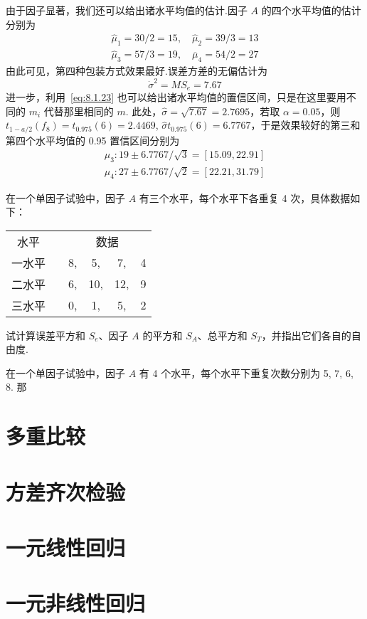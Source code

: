 \begin{example}
  由于因子显著，我们还可以给出诸水平均值的估计.因子 $A$ 的四个水平均值的估计分别为 
  \begin{gather*}
    \hat{\mu}_{1}=30 / 2=15, \quad \hat{\mu}_{2}=39 / 3=13 \\
    \hat{\mu}_{3}=57 / 3=19, \quad \overline{\mu}_{4}=54 / 2=27
  \end{gather*} 
  由此可见，第四种包装方式效果最好.误差方差的无偏估计为
  \begin{equation*}
    \dot{\sigma}^{2}=M S_{e}=7.67
  \end{equation*}
  进一步，利用~\eqref{eq:8.1.23} 也可以给出诸水平均值的置信区间，只是在这里要用不同的 $m_i$ 代替那里相同的 $m$. 此处，$\hat{\sigma} = \sqrt{7.67}=2.7695$，若取 $\alpha=0.05$，则 $t_{1-a / 2}\left(f_{8}\right)=t_{0.975}(6)=2.4469$, $\hat{\sigma} t_{0.975}(6)=6.7767$，于是效果较好的第三和第四个水平均值的 0.95 置信区间分别为
\begin{gather*}
  \mu_{3} : 19 \pm 6.7767 / \sqrt{3}=[15.09,22.91] \\
  \mu_{4} : 27 \pm 6.7767 / \sqrt{2}=[22.21,31.79]
\end{gather*}
\end{example}

\begin{xiti}
  \item 在一个单因子试验中，因子 $A$ 有三个水平，每个水平下各重复 4 次，具体数据如下：
    \begin{tabular}{cccccc}
    水平    &       & \multicolumn{4}{c}{数据} \\
    一水平   &       & 8,    & 5,    & 7,    & 4 \\
    二水平   &       & 6,    & 10,   & 12,   & 9 \\
    三水平   &       & 0,    & 1,    & 5,    & 2 \\
    \end{tabular}%
    试计算误差平方和 $S_e$、因子 $A$ 的平方和 $S_A$、总平方和 $S_T$，并指出它们各自的自由度.
    \item 在一个单因子试验中，因子 $A$ 有 4 个水平，每个水平下重复次数分别为 5, 7, 6, 8. 那
\end{xiti}

\section{多重比较}\label{sec:8.2}

\section{方差齐次检验}\label{sec:8.3}

\section{一元线性回归}\label{sec:8.4}

\section{一元非线性回归}\label{sec:8.5}